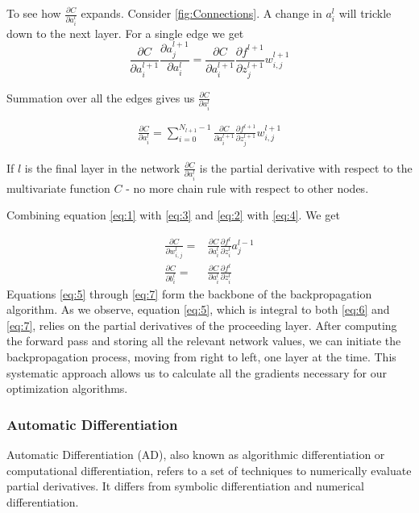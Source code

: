 \documentclass{article}
\theoremstyle{definition}
\begin{document}
\noindent
To see how $\frac{\partial C}{\partial a_i^l}$ expands. Consider \autoref{fig:Connections}. A change in $a_i^l$ will trickle down to the next layer. For a single edge we get
\[
\frac{\partial C}{\partial a_i^{l+1}} \frac{\partial a_j^{l+1}}{\partial a_i^l} =  \frac{\partial C}{\partial a_i^{l+1}} \frac{\partial f^{l+1}}{\partial z_j^{l+1}} w_{i,j}^{l+1}
\]

Summation over all the edges gives us $\frac{\partial C}{\partial a_i^l}$


\begin{align}
    \frac{\partial C}{\partial a_i^l} =  \sum_{i=0}^{N_{l+1}-1} \frac{\partial C}{\partial a_i^{l+1}} \frac{\partial f^{l+1}}{\partial z_j^{l+1}} w_{i,j}^{l+1} \label{eq:5} 
\end{align}


If $l$ is the final layer in the network $\frac{\partial C}{\partial a_i^l}$ is the partial derivative with respect to the multivariate function $C$ - no more chain rule with respect to other nodes.

Combining equation \eqref{eq:1} with \eqref{eq:3} and \eqref{eq:2} with \eqref{eq:4}. We get

\begin{align}
     \frac{\partial C}{\partial w_{i,j}^l} =& \frac{\partial C}{\partial a_i^l} \frac{\partial f^l}{\partial z_i^l} a_j^{l-1}\label{eq:6} 
    \\
    \frac{\partial C}{\partial b_i^l} = & \frac{\partial C}{\partial a_i^l} \frac{\partial f^l}{\partial z_i^l} \label{eq:7} 
\end{align}
Equations \eqref{eq:5} through \eqref{eq:7} form the backbone of the backpropagation algorithm. As we observe, equation \eqref{eq:5}, which is integral to both \eqref{eq:6} and \eqref{eq:7}, relies on the partial derivatives of the proceeding layer. After computing the forward pass and storing all the relevant network values, we can initiate the backpropagation process, moving from right to left, one layer at the time. This systematic approach allows us to calculate all the gradients necessary for our optimization algorithms.
\subsubsection{Automatic Differentiation}
Automatic Differentiation (AD), also known as algorithmic differentiation or computational differentiation, refers to a set of techniques to numerically evaluate partial derivatives. It differs from symbolic differentiation and numerical differentiation.
\end{document}
